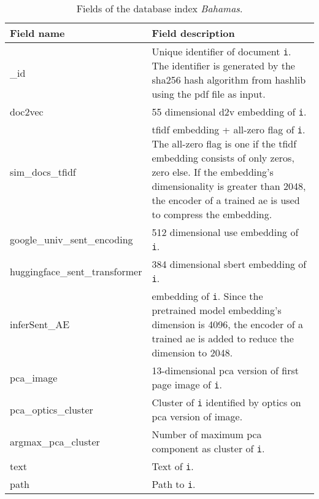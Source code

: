 \begin{table}[]
    \caption{Fields of the \databaseName{} database index \textit{Bahamas}.}
    \begin{tabular}{|
    >{\columncolor[HTML]{EFEFEF}}l |p{}|}
    \hline
    \cellcolor[HTML]{C0C0C0}\textbf{Field name} & \cellcolor[HTML]{C0C0C0}\textbf{Field description}                                     \\ \hline
    \_id                                        & Unique identifier of document \texttt{i}. The identifier is generated by the sha256 hash algorithm from hashlib using the \ac{pdf} file as input.\\ \hline
    doc2vec                                     & 55 dimensional \ac{d2v} embedding of \texttt{i}.                                                          \\ \hline
    sim\_docs\_tfidf                            & \ac{tfidf} embedding + all-zero flag of \texttt{i}. The all-zero flag is one if the \ac{tfidf} embedding consists of only zeros, zero else. If the embedding's dimensionality is greater than 2048, the encoder of a trained \ac{ae} is used to compress the embedding.\\ \hline
    google\_univ\_sent\_encoding                & 512 dimensional \ac{use} embedding of \texttt{i}.                                     \\ \hline
    huggingface\_sent\_transformer              & 384 dimensional \ac{sbert} embedding of \texttt{i}.                                  \\ \hline
    inferSent\_AE                               & \infersent{} embedding of \texttt{i}. Since the pretrained \infersent{} model embedding's dimension is 4096, the encoder of a trained \ac{ae} is added to reduce the dimension to 2048.                                                    \\ \hline
    pca\_image                                  & 13-dimensional \ac{pca} version of first page image of \texttt{i}.                      \\ \hline
    pca\_optics\_cluster                        & Cluster of \texttt{i} identified by \acs{optics} on \ac{pca} version of image.            \\ \hline
    argmax\_pca\_cluster                        & Number of maximum \ac{pca} component as cluster of \texttt{i}.                            \\ \hline
    text                                        & Text of \texttt{i}.                                                                       \\ \hline
    path                                        & Path to \texttt{i}.                                                     \\ \hline
    \end{tabular}
    \label{tbl:Elasticsearch-fields}
\end{table}

